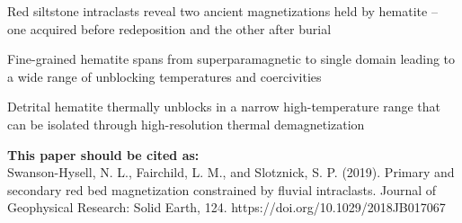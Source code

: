 \documentclass[draft]{agujournal2019}
\begin{document}




\begin{keypoints}
\item Red siltstone intraclasts reveal two ancient magnetizations held by hematite -- one acquired before redeposition and the other after burial
\item Fine-grained hematite spans from superparamagnetic to single domain leading to a wide range of unblocking temperatures and coercivities
\item  Detrital hematite thermally unblocks in a narrow high-temperature range that can be isolated through high-resolution thermal demagnetization


\end{keypoints}

\noindent \textbf{This paper should be cited as:} \\
\vspace{0.2 in}
\noindent Swanson-Hysell, N. L., Fairchild, L. M., and Slotznick, S. P. (2019). Primary and secondary red bed magnetization constrained by fluvial intraclasts. Journal of Geophysical Research: Solid Earth, 124. https://doi.org/10.1029/2018JB017067

%
%

\end{document}
